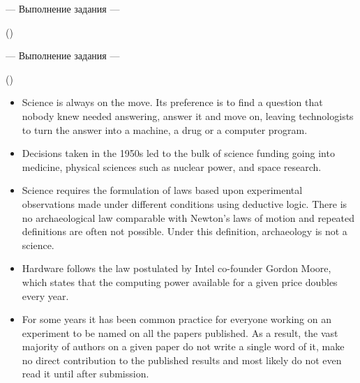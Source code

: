 \documentclass[main.tex]{subfiles}
\begin{document}



\hypertarget{ltask:2024-04-10-1}{--- Выполнение задания ---} (\hyperref[task:2024-04-03-2]{\color{blue}{перейти к тексту задания}})


\newpage
{}

\hypertarget{ltask:2024-04-10-2}{--- Выполнение задания ---} (\hyperref[task:2024-04-10-2]{\color{blue}{перейти к тексту задания}})
\\

\vspace{5pt}
\begin{itemize}[nosep, leftmargin=*]
	\itemsep10pt
	\item Science is always on the move. Its preference is to find a question that nobody knew needed answering, answer it and move on, leaving technologists to turn the answer into a machine, a drug or a computer program.
	\item Decisions taken in the 1950s led to the bulk of science funding going into medicine, physical sciences such as nuclear power, and space research.
	\item Science requires the formulation of laws based upon experimental observations made under different conditions using deductive logic. There is no archaeological law comparable with Newton's laws of motion and repeated definitions are often not possible. Under this definition, archaeology is not a science.
	\item Hardware follows the law postulated by Intel co-founder Gordon Moore, which states that the computing power available for a given price doubles every year.
	\item For some years it has been common practice for everyone working on an experiment to be named on all the papers published. As a result, the vast majority of authors on a given paper do not write a single word of it, make no direct contribution to the published results and most likely do not even read it until after submission.
\end{itemize}
\end{document}

